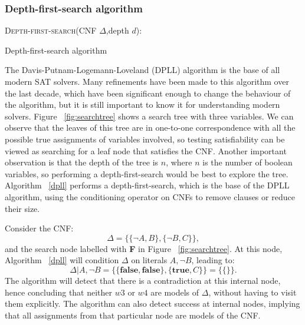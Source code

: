 \documentclass[12pt]{diicc}
\begin{document}
\subsubsection{Depth-first-search algorithm}

\begin{algorithm}
\textsc{Depth-first-search}(CNF $\Delta$,depth $d$):\\
\caption{Depth-first-search algorithm\label{dpll}}
\end{algorithm}    

The Davis-Putnam-Logemann-Loveland (DPLL) \cite{dpll} algorithm is the base of all modern SAT solvers. Many refinements have been made to this algorithm over the last decade, which have been significant enough to change the behaviour of the algorithm, but it is still important to know it for understanding modern solvers. Figure ~\ref{fig:searchtree} shows a search tree with three variables. We can observe that the leaves of this tree are in one-to-one correspondence with all the possible true assignments of variables involved, so testing satisfiability can be viewed as searching for a leaf node that satisfies the CNF. Another important observation is that the depth of the tree is $n$, where $n$ is the number of boolean variables, so performing a depth-first-search would be best to explore the tree. Algorithm ~\ref{dpll} performs a depth-first-search, which is the base of the DPLL algorithm, using the conditioning operator on CNFs to remove clauses or reduce their size.

Consider the CNF:
\[\Delta=\{\{\neg A,B\},\{\neg B,C\}\},\]
and the search node labelled with \textbf{F} in Figure ~\ref{fig:searchtree}. At this node, Algorithm ~\ref{dpll} will condition $\Delta$ on literals $A,\neg B$, leading to:
\[\Delta |A,\neg B=\{ \{\textbf{false},\textbf{false}\},\{\textbf{true},C\}\}=\{\{\}\}.\]
The algorithm will detect that there is a contradiction at this internal node, hence concluding that neither $w3$ or $w4$ are models of $\Delta$, without having to visit them explicitly. The algorithm can also detect success at internal nodes, implying that all assignments from that particular node are models of the CNF.
\end{document}

